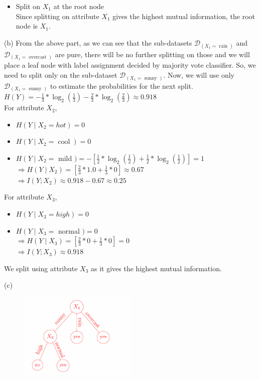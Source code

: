 \begin{itemize}
    \item Split on $X_{1}$ at the root node\\
    Since splitting on attribute $X_{1}$ gives the highest mutual information, the root node is $X_{1}$.
\end{itemize}


(b) From the above part, as we can see that the sub-datasets $\mathcal{D}_{\left(X_{1}=\text { rain }\right)}$ and $\mathcal{D}_{\left(X_{1}=\text { overcast }\right)}$ are pure, there will be no further splitting on those and we will place a leaf node with label assignment decided by majority vote classifier. So, we need to split only on the sub-dataset $\mathcal{D}_{\left(X_{1}=\text { sunny }\right)}$. Now, we will use only $\mathcal{D}_{\left(X_{1}=\text { sunny }\right)}$ to estimate the probabilities for the next split.\\
$H(Y)=-\frac{1}{3} * \log _{2}\left(\frac{1}{3}\right)-\frac{2}{3} * \log _{2}\left(\frac{2}{3}\right) \approx 0.918$\\
For attribute $X_{2}$,
\begin{itemize}
    \item $H\left(Y \mid X_{2}=h o t\right)=0$
    \item $H\left(Y \mid X_{2}=\operatorname{cool}\right)=0$
    \item $H\left(Y \mid X_{2}=\right.$ mild $)=-\left[\frac{1}{2} * \log _{2}\left(\frac{1}{2}\right)+\frac{1}{2} * \log _{2}\left(\frac{1}{2}\right)\right]=1$\\
$\Rightarrow H\left(Y \mid X_{2}\right)=\left[\frac{2}{3} * 1.0+\frac{1}{3} * 0\right] \approx 0.67$\\
$\Rightarrow I\left(Y ; X_{2}\right) \approx 0.918-0.67 \approx 0.25$\\
\end{itemize}
For attribute $X_{3}$,
\begin{itemize}
    \item $H\left(Y \mid X_{3}=h i g h\right)=0$
    \item $H\left(Y \mid X_{3}=\right.$ normal $)=0$\\
$\Rightarrow H\left(Y \mid X_{3}\right)=\left[\frac{2}{3} * 0+\frac{1}{3} * 0\right]=0$\\
$\Rightarrow I\left(Y ; X_{3}\right) \approx 0.918$
\end{itemize}
We split using attribute $X_{3}$ as it gives the highest mutual information.


(c) \\
\begin{figure}[h!] %
    \includegraphics[width=0.5\textwidth]{./DT-3.png} %
    \label{fig:DT-3} %
\end{figure}

\newpage